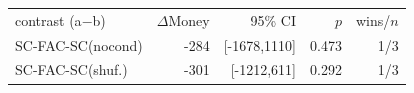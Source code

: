 \begin{tabular}{lrrrr}
\hline
contrast (a$-$b) & $\Delta$Money & 95\% CI & $p$ & wins/$n$\\
SC-FAC-SC(nocond) & -284 & [-1678,1110] & 0.473 & 1/3\\
SC-FAC-SC(shuf.) & -301 & [-1212,611] & 0.292 & 1/3\\
\hline
\end{tabular}